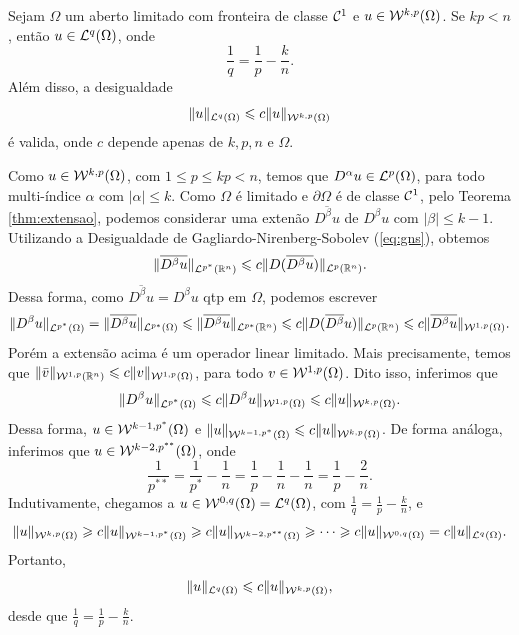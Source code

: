 \begin{tbox} \label{thm:geral-1}
    Sejam $\Omega$ um aberto limitado com fronteira de classe $\mathcal{C}^1$ e $u \in \mathcal{W}^{k,p}(\Omega)$.
    Se $kp < n$, então $u \in \mathcal{L}^q(\Omega)$, onde
    \[
        \frac{1}{q} = \frac{1}{p} - \frac{k}{n}.
    \]
    Além disso, a desigualdade
    \[
        \Vert u \Vert_{\mathcal{L}^q(\Omega)} \leqslant c \Vert u \Vert_{\mathcal{W}^{k,p}(\Omega)}
    \]
    é valida, onde $c$ depende apenas de $k, p, n$ e $\Omega$.
\end{tbox}
\begin{prf}
    Como $u \in \mathcal{W}^{k,p}(\Omega)$, com $1 \leqslant p \leqslant kp < n$, temos que $D^\alpha u \in \mathcal{L}^p(\Omega)$, para todo multi-índice $\alpha$ com $|\alpha| \leqslant k$. 
    Como $\Omega$ é limitado e $\partial\Omega$ é de classe $\mathcal{C}^1$, pelo Teorema \ref{thm:extensao}, podemos considerar uma extenão $\overline{D^\beta u}$ de $D^\beta u$ com $|\beta| \leqslant k -1$. 
    Utilizando a Desigualdade de Gagliardo-Nirenberg-Sobolev (\ref{eq:gns}), obtemos
    \[
        \Vert \overline{D^\beta u} \Vert_{\mathcal{L}^{p^*}(\mathbb{R}^n)} \leqslant c \Vert D (\overline{D^\beta u}) \Vert_{\mathcal{L}^p(\mathbb{R}^ n)}.
    \]
    Dessa forma, como $\overline{D^\beta u} = D^\beta u$ qtp em $\Omega$, podemos escrever
    \[
        \Vert D^\beta u \Vert_{\mathcal{L}^{p^*}(\Omega)} = \Vert \overline{D^\beta u} \Vert_{\mathcal{L}^{p*}(\Omega)} \leqslant \Vert \overline{D^\beta u} \Vert_{\mathcal{L}^{p*}(\mathbb{R}^n)} \leqslant c \Vert D (\overline{D^\beta}u) \Vert_{\mathcal{L}^p(\mathbb{R}^ n)} \leqslant c \Vert \overline{D^\beta u} \Vert_{\mathcal{W}^{1,p}(\Omega)}.
    \]
    Porém a extensão acima é um operador linear limitado. Mais precisamente, temos que $\Vert \bar v \Vert_{\mathcal{W}^{1,p}(\mathbb{R}^n)} \leqslant c \Vert v \Vert_{\mathcal{W}^{1,p}(\Omega)}$, para todo $v \in \mathcal{W}^{1,p}(\Omega)$. Dito isso, inferimos que
    \[
        \Vert D^\beta u \Vert_{\mathcal{L}^{p^*}(\Omega)} \leqslant c \Vert D^\beta u \Vert_{\mathcal{W}^{1,p}(\Omega)} \leqslant c \Vert u \Vert_{\mathcal{W}^{k,p}(\Omega)}.
    \]
    Dessa forma, $u \in \mathcal{W}^{k-1,p^*}(\Omega)$ e $\Vert u \Vert_{\mathcal{W}^{k-1,p^*}(\Omega)} \leqslant c \Vert u \Vert_{\mathcal{W}^{k,p}(\Omega)}$.
    De forma análoga, inferimos que $u \in \mathcal{W}^{k-2,p^{**}}(\Omega)$, onde
    \[
        \frac{1}{p^{**}} = \frac{1}{p^*} - \frac{1}{n} = \frac{1}{p} - \frac{1}{n} - \frac{1}{n} = \frac{1}{p} - \frac{2}{n}.
    \]
    Indutivamente, chegamos a $u \in \mathcal{W}^{0,q}(\Omega) = \mathcal{L}^q(\Omega)$, com $\frac{1}{q} = \frac{1}{p} - \frac{k}{n}$, e
    \[
        \Vert u \Vert_{\mathcal{W}^{k,p}(\Omega)} \geqslant c \Vert u \Vert_{\mathcal{W}^{k-1,p^*}(\Omega)} \geqslant c \Vert u \Vert_{\mathcal{W}^{k-2,p^{**}}(\Omega)} \geqslant \cdots\geqslant c \Vert u \Vert_{\mathcal{W}^{0,q}(\Omega)} = c\Vert u \Vert_{\mathcal{L}^q(\Omega)}.
    \]
    Portanto,
    \[
        \Vert u \Vert_{\mathcal{L}^q(\Omega)} \leqslant c \Vert u \Vert_{\mathcal{W}^{k,p}(\Omega)},
    \]
    desde que $\frac{1}{q} = \frac{1}{p} - \frac{k}{n}$.
\end{prf}

